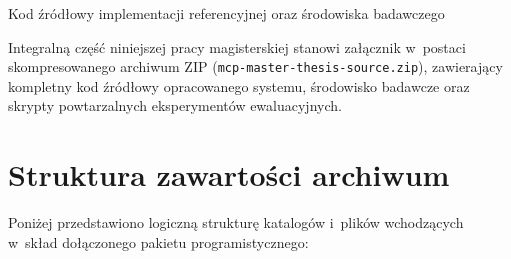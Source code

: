 \begin{easyappendix}{Kod źródłowy implementacji referencyjnej oraz środowiska badawczego}
\label{app:kod_zrodlowy}

Integralną część niniejszej pracy magisterskiej stanowi załącznik w~postaci skompresowanego archiwum ZIP (\texttt{mcp-master-thesis-source.zip}), zawierający kompletny kod źródłowy opracowanego systemu, środowisko badawcze oraz skrypty powtarzalnych eksperymentów ewaluacyjnych.

\section*{Struktura zawartości archiwum}

Poniżej przedstawiono logiczną strukturę katalogów i~plików wchodzących w~skład dołączonego pakietu programistycznego:


\end{easyappendix}
